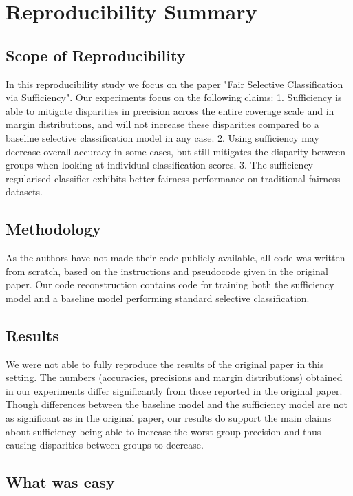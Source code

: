 \section*{\centering Reproducibility Summary}

\subsection*{Scope of Reproducibility}
In this reproducibility study we focus on the paper "Fair Selective Classification via Sufficiency". Our experiments focus on the following claims: 1. Sufficiency is able to mitigate disparities in precision across the entire coverage scale and in margin distributions, and will not increase these disparities compared to a baseline selective classification model in any case. 2. Using sufficiency may decrease overall accuracy in some cases, but still mitigates the disparity between groups when looking at individual classification scores. 3. The sufficiency-regularised classifier exhibits better fairness performance on traditional fairness datasets.

\subsection*{Methodology}
As the authors have not made their code publicly available, all code was written from scratch, based on the instructions and pseudocode given in the original paper. Our code reconstruction contains code for training both the sufficiency model and a baseline model performing standard selective classification.

\subsection*{Results}
We were not able to fully reproduce the results of the original paper in this setting. The numbers (accuracies, precisions and margin distributions) obtained in our experiments differ significantly from those reported in the original paper. Though differences between the baseline model and the sufficiency model are not as significant as in the original paper, our results do support the main claims about sufficiency being able to increase the worst-group precision and thus causing disparities between groups to decrease. 

\subsection*{What was easy}

